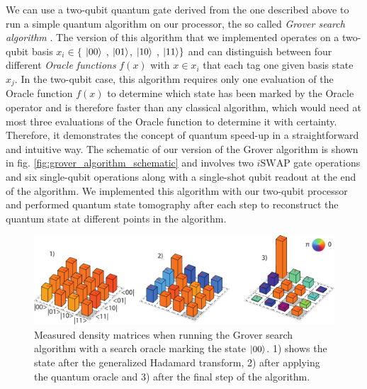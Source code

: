 We can use a two-qubit quantum gate derived from the one described above to run a simple quantum algorithm on our processor, the so called {\it Grover search algorithm} \citep{Grover_Quantum_1997}. The version of this algorithm that we implemented operates on a two-qubit basis $x_i \in \{$ $\left| 00 \right>$ , $\left| 01 \right>$, $\left| 10 \right>$ , $\left| 11 \right>\}$ and can distinguish between four different {\it Oracle functions} $f(x)$ with $x \in x_i$ that each tag one given basis state $x_j$. In the two-qubit case, this algorithm requires only one evaluation of the Oracle function $f(x)$ to determine which state has been marked by the Oracle operator and is therefore faster than any classical algorithm, which would need at most three evaluations of the Oracle function to determine it with certainty. Therefore, it demonstrates the concept of quantum speed-up in a straightforward and intuitive way. The schematic of our version of the Grover algorithm is shown in fig. \ref{fig:grover_algorithm_schematic} and involves two $i\mathrm{SWAP}$ gate operations and six single-qubit operations along with a single-shot qubit readout at the end of the algorithm. We implemented this algorithm with our two-qubit processor and performed quantum state tomography after each step to reconstruct the quantum state at different points in the algorithm. 

\begin{figure}[ht!]
	\centering
		\includegraphics[width=1.\textwidth]{./material/figures/2-qubit-processor/grover/grover-density-matrices-state-1}
	\caption[Measured density matrices when running the Grover algorithm]{Measured density matrices when running the Grover search algorithm with a search oracle marking the state $\left| 00 \right>$. 1) shows the state after the generalized Hadamard transform, 2) after applying the quantum oracle and 3) after the final step of the algorithm.} 
	\label{fig:grover_density_matrices_state_1}
\end{figure}

